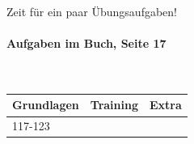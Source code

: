 Zeit für ein paar Übungsaufgaben!

\paragraph{Aufgaben im Buch, Seite 17}
$ $ \newline
\begin{tabular}{|lll|}
\hline
\textbf{Grundlagen} & \textbf{Training} & \textbf{Extra}\\
\hline
117-123 & & \\
\hline
\end{tabular}

\newpage

% 
